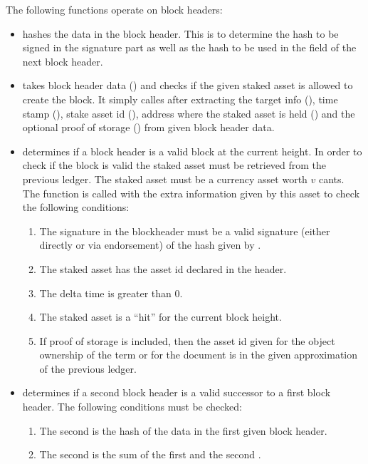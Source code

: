 The following functions operate on block headers:
\begin{itemize}
\item {} hashes the data in the block header. This is to determine
the hash to be signed in the signature part
as well as the hash to be used in the {} field of the next block header.
\item {} takes block header data ({})
and checks if the given staked asset is allowed to create the block.
It simply calles {} after
extracting the target info ({}), time stamp ({}),
stake asset id ({}),
address where the staked asset is held ({})
and the optional proof of storage ({})
from given block header data.
\item {} determines if a block header is a valid block at the current height.
In order to check if the block is valid the staked asset must be retrieved from
the previous ledger.
The staked asset must be a currency asset worth $v$ cants.
The function {} is called with the extra information given by this asset
to check the following conditions:
\begin{enumerate}
\item The signature in the blockheader must be a valid signature (either directly or via endorsement) of the hash given by {}.
\item The staked asset has the asset id declared in the header.
\item The delta time is greater than $0$.
\item The staked asset is a ``hit'' for the current block height.
\item If proof of storage is included, then the asset id given for the
object ownership of the term or
for the document
is in the given approximation of the previous ledger.
\end{enumerate}
\item {} determines if a second block header is a valid successor to a first block header.
The following conditions must be checked:
\begin{enumerate}
\item The second {} is the hash of the data in the first given block header.
\item The second {} is the sum of the first {} and the second {}.

\end{enumerate}
\end{itemize}
